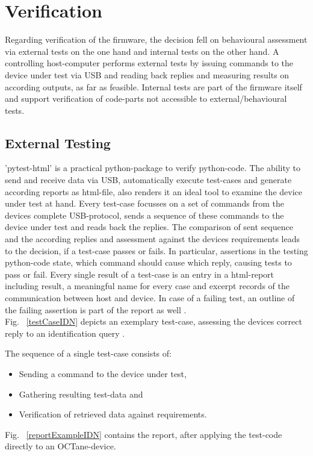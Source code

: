 

		\section{Verification}
				Regarding verification of the firmware, the decision fell on behavioural assessment via external tests on the one hand and internal tests on the other hand. A controlling host-computer performs external tests by issuing commands to the device under test via USB and reading back replies and measuring results on according outputs, as far as feasible. Internal tests are part of the firmware itself and support verification of code-parts not accessible to external/behavioural tests.
			\subsection{External Testing}
				'pytest-html' is a practical python-package to verify python-code. The ability to send and receive data via USB, automatically execute test-cases and generate according reports as html-file, also renders it an ideal tool to examine the device under test at hand. Every test-case focusses on a set of commands from the devices complete USB-protocol, sends a sequence of these commands to the device under test and reads back the replies. The comparison of sent sequence and the according replies and assessment against the devices requirements leads to the decision, if a test-case passes or fails. In particular, assertions in the testing python-code state, which command should cause which reply, causing tests to pass or fail. Every single result of a test-case is an entry in a html-report including result, a meaningful name for every case and excerpt records of the communication between host and device. In case of a failing test, an outline of the failing assertion is part of the report as well \cite{Hunt2019}. \\
				
				Fig. ~\ref{testCaseIDN} depicts an exemplary test-case, assessing the devices correct reply to an identification query \cite{BalajiScpi}.
			
			The sequence of a single test-case consists of:
			\begin{itemize} \setlength\itemsep{1px}
			\item Sending a command to the device under test,
			\item Gathering resulting test-data and
			\item Verification of retrieved data against requirements.
			\end{itemize}
			Fig. ~\ref{reportExampleIDN} contains the report, after applying the test-code directly to an OCTane-device.
			
